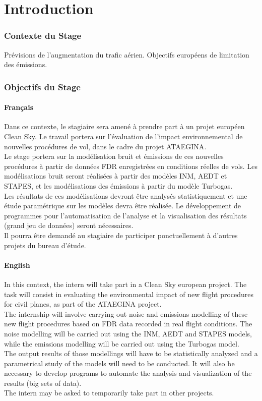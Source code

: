 \documentclass[a4paper,12pt,twoside]{article}
\begin{document}
    \part{Introduction}
    \section{Contexte du Stage}
    Prévisions de l'augmentation du trafic aérien. Objectifs européens de limitation des émissions.
    
    \section{Objectifs du Stage}
    \subsection*{Français}
    Dans ce contexte, le stagiaire sera amené à prendre part à un projet européen \gls{Clean Sky}. Le travail portera sur l'évaluation de l'impact environnemental de nouvelles procédures de vol, dans le cadre du projet \gls{ATAEGINA}.\\
    Le stage portera sur la modélisation bruit et émissions de ces nouvelles procédures à partir de données \gls{FDR} enregistrées en conditions réelles de vols. Les modélisations bruit seront réalisées à partir des modèles \gls{INM}, \gls{AEDT} et \gls{STAPES}, et les modélisations des émissions à partir du modèle \gls{Turbogas}.\\
    Les résultats de ces modélisations devront être analysés statistiquement et une étude paramétrique sur les modèles devra être réalisée. Le développement de programmes pour l'automatisation de l'analyse et la visualisation des résultats (grand jeu de données) seront nécessaires.\\
    Il pourra être demandé au stagiaire de participer ponctuellement à d'autres projets du bureau d'étude.
    \subsection*{English}
    In this context, the intern will take part in a \gls{Clean Sky} european project. The task will consist in evaluating the environmental impact of new flight procedures for civil planes, as part of the \gls{ATAEGINA} project.\\
    The internship will involve carrying out noise and emissions modelling of these new flight procedures based on \gls{FDR} data recorded in real flight conditions. The noise modelling will be carried out using the \gls{INM}, \gls{AEDT} and \gls{STAPES} models, while the emissions modelling will be carried out using the Turbogas model.\\
    The output results of those modellings will have to be statistically analyzed and a parametrical study of the models will need to be conducted. It will also be necessary to develop programs to automate the analysis and visualization of the results (big sets of data).\\
    The intern may be asked to temporarily take part in other projects.
    \newpage
    
\end{document}
